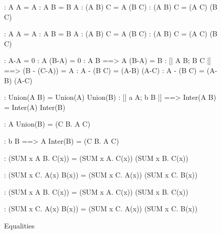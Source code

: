 \begin{figure}
\begin{alltt*}\isastyleminor
{}:        A \isasyminter A = A
:       A \isasyminter B = B \isasyminter A
:         (A \isasyminter B) \isasyminter C  =  A \isasyminter (B \isasyminter C)
:    (A \isasymunion B) \isasyminter C  =  (A \isasyminter C) \isasymunion (B \isasyminter C)

:         A \isasymunion A = A
:        A \isasymunion B = B \isasymunion A
:          (A \isasymunion B) \isasymunion C  =  A \isasymunion (B \isasymunion C)
:    (A \isasyminter B) \isasymunion C  =  (A \isasymunion C) \isasyminter (B \isasymunion C)

:       A-A = 0
:     A \isasyminter (B-A) = 0
:    A \isasymsubseteq B ==> A \isasymunion (B-A) = B
: [| A \isasymsubseteq B; B \isasymsubseteq C |] ==> (B - (C-A)) = A
:           A - (B \isasymunion C) = (A-B) \isasyminter (A-C)
:          A - (B \isasyminter C) = (A-B) \isasymunion (A-C)

:  Union(A \isasymunion B) = Union(A) \isasymunion Union(B)
:  [| a \isasymin A;  b \isasymin B |] ==> 
                   Inter(A \isasymunion B) = Inter(A) \isasyminter Inter(B)

:  A \isasyminter Union(B) = ({\isasymUnion}C \isasymin B. A \isasyminter C)

:   b \isasymin B ==> 
                   A \isasymunion Inter(B) = ({\isasymInter}C \isasymin B. A \isasymunion C)

:   (SUM x \isasymin A \isasymunion B. C(x)) = 
                   (SUM x \isasymin A. C(x)) \isasymunion (SUM x \isasymin B. C(x))

:   (SUM x \isasymin C. A(x) \isasymunion B(x)) =
                   (SUM x \isasymin C. A(x)) \isasymunion (SUM x \isasymin C. B(x))

:  (SUM x \isasymin A \isasyminter B. C(x)) =
                   (SUM x \isasymin A. C(x)) \isasyminter (SUM x \isasymin B. C(x))

:  (SUM x \isasymin C. A(x) \isasyminter B(x)) =
                   (SUM x \isasymin C. A(x)) \isasyminter (SUM x \isasymin C. B(x))
\end{alltt*}
\caption{Equalities} \label{zf-equalities}
\end{figure}


